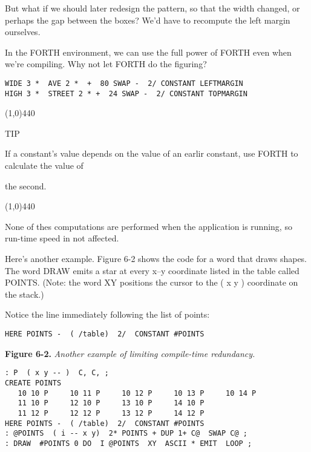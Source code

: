 \documentclass{book}
\begin{document}
But what if we should later redesign the pattern, so that the width changed, or perhaps the gap between the boxes? We'd have to recompute the left margin ourselves.

In the FORTH environment, we can use the full power of FORTH even when we're compiling. Why not let FORTH do the figuring?

\begin{verbatim}
WIDE 3 *  AVE 2 *  +  80 SWAP -  2/ CONSTANT LEFTMARGIN
HIGH 3 *  STREET 2 * +  24 SWAP -  2/ CONSTANT TOPMARGIN
\end{verbatim}

\line(1,0){440} 

TIP 

If a constant's value depends on the value of an earlir constant, use FORTH to calculate the value of

the second.

\line(1,0){440}

\bigskip

\noindent
None of thes computations are performed when the application is running, so run-time speed in not affected.

Here's another example. Figure 6-2 shows the code for a word that draws shapes. The word DRAW emits a star at every x--y coordinate listed in the table called POINTS. (Note: the word XY positions the cursor to the ( x y ) coordinate on the stack.)

Notice the line immediately following the list of points:

\begin{verbatim}
HERE POINTS -  ( /table)  2/  CONSTANT #POINTS
\end{verbatim}


\begin{footnotesize}
\noindent
\textbf{Figure 6-2.} \textit{Another example of limiting compile-time redundancy.}
\end{footnotesize}

\begin{verbatim}
: P  ( x y -- )  C, C, ;
CREATE POINTS
   10 10 P     10 11 P     10 12 P     10 13 P     10 14 P
   11 10 P     12 10 P     13 10 P     14 10 P
   11 12 P     12 12 P     13 12 P     14 12 P
HERE POINTS -  ( /table)  2/  CONSTANT #POINTS
: @POINTS  ( i -- x y)  2* POINTS + DUP 1+ C@  SWAP C@ ;
: DRAW  #POINTS 0 DO  I @POINTS  XY  ASCII * EMIT  LOOP ;
\end{verbatim}
\end{document}
